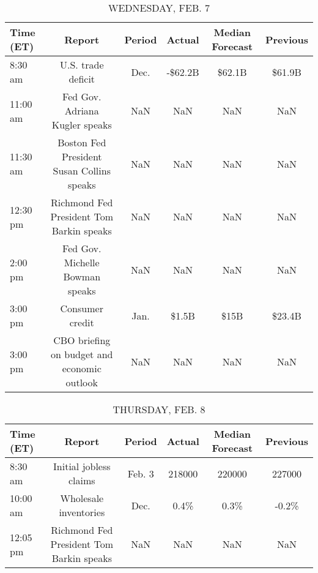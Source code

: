\documentclass{article}%
\begin{document}
\begin{table}[htbp]%
\caption{WEDNESDAY, FEB. 7}%
\centering%
\begin{adjustbox}{width=1\textwidth}%
\begin{tabular}{lccccc}
\toprule
Time (ET) &                                      Report & Period &  Actual & Median Forecast & Previous \\
\midrule
  8:30 am &                          U.S. trade deficit &   Dec. & -\$62.2B &          \$62.1B &   \$61.9B \\
 11:00 am &              Fed Gov. Adriana Kugler speaks &    NaN &     NaN &             NaN &      NaN \\
 11:30 am &   Boston Fed President Susan Collins speaks &    NaN &     NaN &             NaN &      NaN \\
 12:30 pm &    Richmond Fed President Tom Barkin speaks &    NaN &     NaN &             NaN &      NaN \\
  2:00 pm &             Fed Gov. Michelle Bowman speaks &    NaN &     NaN &             NaN &      NaN \\
  3:00 pm &                             Consumer credit &   Jan. &   \$1.5B &            \$15B &   \$23.4B \\
  3:00 pm & CBO briefing on budget and economic outlook &    NaN &     NaN &             NaN &      NaN \\
\bottomrule
\end{tabular}
%
\end{adjustbox}%
\end{table}

%


\begin{table}[htbp]%
\caption{THURSDAY, FEB. 8}%
\centering%
\begin{adjustbox}{width=1\textwidth}%
\begin{tabular}{lccccc}
\toprule
Time (ET) &                                   Report & Period & Actual & Median Forecast & Previous \\
\midrule
  8:30 am &                   Initial jobless claims & Feb. 3 & 218000 &          220000 &   227000 \\
 10:00 am &                    Wholesale inventories &   Dec. &   0.4\% &            0.3\% &    -0.2\% \\
 12:05 pm & Richmond Fed President Tom Barkin speaks &    NaN &    NaN &             NaN &      NaN \\
\bottomrule
\end{tabular}
%
\end{adjustbox}%
\end{table}
\end{document}
